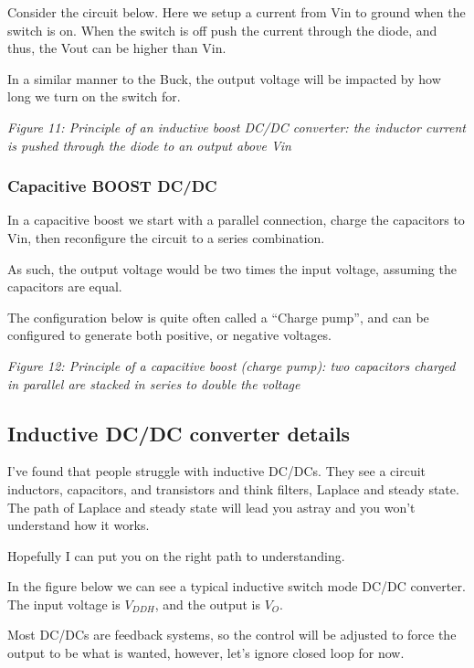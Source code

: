 Consider the circuit below. Here we setup a current from Vin to ground
when the switch is on. When the switch is off push the current through
the diode, and thus, the Vout can be higher than Vin.

In a similar manner to the Buck, the output voltage will be impacted by
how long we turn on the switch for.


{
\centering
{}
}

\emph{Figure 11: Principle of an inductive boost DC/DC converter: the
inductor current is pushed through the diode to an output above Vin}

\subsubsection{Capacitive BOOST DC/DC}\label{capacitive-boost-dcdc}

In a capacitive boost we start with a parallel connection, charge the
capacitors to Vin, then reconfigure the circuit to a series combination.

As such, the output voltage would be two times the input voltage,
assuming the capacitors are equal.

The configuration below is quite often called a ``Charge pump'', and can
be configured to generate both positive, or negative voltages.


{
\centering
{}
}

\emph{Figure 12: Principle of a capacitive boost (charge pump): two
capacitors charged in parallel are stacked in series to double the
voltage}

\subsection{Inductive DC/DC converter
details}\label{inductive-dcdc-converter-details}

I've found that people struggle with inductive DC/DCs. They see a
circuit inductors, capacitors, and transistors and think filters,
Laplace and steady state. The path of Laplace and steady state will lead
you astray and you won't understand how it works.

Hopefully I can put you on the right path to understanding.

In the figure below we can see a typical inductive switch mode DC/DC
converter. The input voltage is \(V_{DDH}\), and the output is \(V_O\).

Most DC/DCs are feedback systems, so the control will be adjusted to
force the output to be what is wanted, however, let's ignore closed loop
for now.



